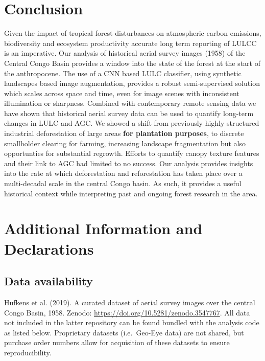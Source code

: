 \documentclass[remote sensing,article,submit,moreauthors,pdftex]{mdpi}
\begin{document}
\hypertarget{conclusion}{%
\section{Conclusion}\label{conclusion}}

Given the impact of tropical forest disturbances on atmospheric carbon
emissions, biodiversity and ecosystem productivity accurate long term
reporting of LULCC is an imperative. Our analysis of historical aerial
survey images (1958) of the Central Congo Basin provides a window into
the state of the forest at the start of the anthropocene. The use of a
CNN based LULC classifier, using synthetic landscapes based image
augmentation, provides a robust semi-supervised solution which scales
across space and time, even for image scenes with inconsistent
illumination or sharpness. Combined with contemporary remote sensing
data we have shown that historical aerial survey data can be used to
quantify long-term changes in LULC and AGC. We showed a shift from
previously highly structured industrial deforestation of large areas
\textbf{for plantation purposes}, to discrete smallholder clearing for
farming, increasing landscape fragmentation but also opportunties for
substantial regrowth. Efforts to quantify canopy texture features and
their link to AGC had limited to no success. Our analysis provides
insights into the rate at which deforestation and reforestation has
taken place over a multi-decadal scale in the central Congo basin. As
such, it provides a useful historical context while interpreting past
and ongoing forest research in the area.

\hypertarget{additional-information-and-declarations}{%
\section{Additional Information and
Declarations}\label{additional-information-and-declarations}}

\hypertarget{data-availability}{%
\subsection{Data availability}\label{data-availability}}

Hufkens et al. (2019). A curated dataset of aerial survey images over
the central Congo Basin, 1958. Zenodo:
\url{https://doi.org/10.5281/zenodo.3547767}. All data not included in
the latter repository can be found bundled with the analysis code as
listed below. Proprietary datasets (i.e.~Geo-Eye data) are not shared,
but purchase order numbers allow for acquisition of these datasets to
ensure reproducibility.
\end{document}
